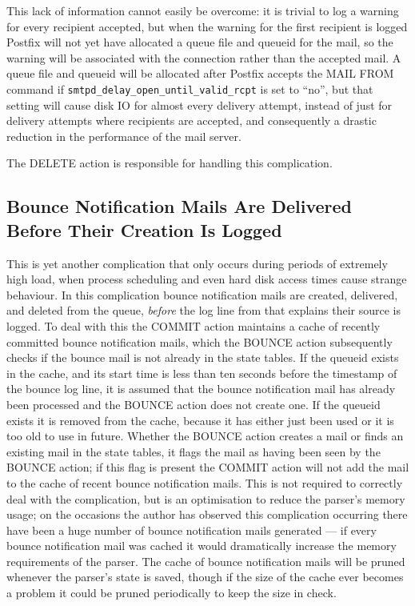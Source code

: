This lack of information cannot easily be overcome: it is trivial to log a
warning for every recipient accepted, but when the warning for the first
recipient is logged Postfix will not yet have allocated a queue file and
queueid for the mail, so the warning will be associated with the connection
rather than the accepted mail.  A queue file and queueid will be allocated
after Postfix accepts the MAIL FROM command if
\texttt{smtpd\_delay\_open\_until\_valid\_rcpt} is set to ``no'', but that
setting will cause disk IO for almost every delivery attempt, instead of
just for delivery attempts where recipients are accepted, and consequently
a drastic reduction in the performance of the mail server.

The DELETE action is responsible for handling this complication.

\subsection{Bounce Notification Mails Are Delivered Before Their Creation
Is Logged}

\label{Bounce notification mails delivered before their creation is logged}

This is yet another complication that only occurs during periods of
extremely high load, when process scheduling and even hard disk access
times cause strange behaviour.  In this complication bounce notification
mails are created, delivered, and deleted from the queue, \textit{before\/}
the log line from  that explains their source is logged.  To
deal with this the COMMIT action maintains a cache of recently committed
bounce notification mails, which the BOUNCE action subsequently checks if
the bounce mail is not already in the state tables.  If the queueid exists
in the cache, and its start time is less than ten seconds before the
timestamp of the bounce log line, it is assumed that the bounce
notification mail has already been processed and the BOUNCE action does not
create one.  If the queueid exists it is removed from the cache, because it
has either just been used or it is too old to use in future.  Whether the
BOUNCE action creates a mail or finds an existing mail in the state tables,
it flags the mail as having been seen by the BOUNCE action; if this flag is
present the COMMIT action will not add the mail to the cache of recent
bounce notification mails.  This is not required to correctly deal
with the complication, but is an optimisation to reduce the parser's memory
usage; on the occasions the author has observed this complication occurring
there have been a huge number of bounce notification mails generated --- if
every bounce notification mail was cached it would dramatically increase
the memory requirements of the parser.  The cache of bounce notification
mails will be pruned whenever the parser's state is saved, though if the
size of the cache ever becomes a problem it could be pruned periodically to
keep the size in check.

